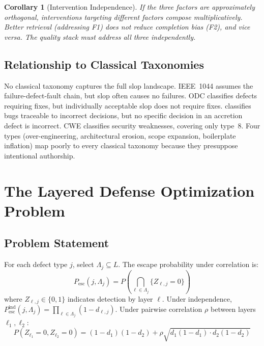 \documentclass[11pt, a4paper, copyright]{googledeepmind}
\newtheorem{corollary}{Corollary}[section]
\newcommand{\Pesc}{P_{\mathrm{esc}}}
\begin{document}
\begin{corollary}[Intervention Independence]
If the three factors are approximately orthogonal, interventions targeting different factors compose multiplicatively. Better retrieval (addressing F1) does not reduce completion bias (F2), and vice versa. The quality stack must address all three independently.
\end{corollary}

\subsection{Relationship to Classical Taxonomies}

No classical taxonomy captures the full slop landscape. IEEE~1044 \citep{ieee1044} assumes the failure-defect-fault chain, but slop often causes no failures. ODC \citep{chillarege1992} classifies defects requiring fixes, but individually acceptable slop does not require fixes. \citet{beizer1990} classifies bugs traceable to incorrect decisions, but no specific decision in an accretion defect is incorrect. CWE classifies security weaknesses, covering only type~8. Four types (over-engineering, architectural erosion, scope expansion, boilerplate inflation) map poorly to every classical taxonomy because they presuppose intentional authorship.


\section{The Layered Defense Optimization Problem}
\label{sec:optimization}

\subsection{Problem Statement}

For each defect type $j$, select $\Lambda_j \subseteq L$. The escape probability under correlation is:
\begin{equation}
\label{eq:pesc}
\Pesc(j, \Lambda_j) = P\!\left(\bigcap_{\ell \in \Lambda_j} \{Z_{\ell,j} = 0\}\right)
\end{equation}
where $Z_{\ell,j} \in \{0,1\}$ indicates detection by layer $\ell$. Under independence, $\Pesc^{\mathrm{ind}}(j, \Lambda_j) = \prod_{\ell \in \Lambda_j} (1 - d_{\ell,j})$. Under pairwise correlation $\rho$ between layers $\ell_1, \ell_2$:
\begin{equation}
P(Z_{\ell_1} = 0, Z_{\ell_2} = 0) = (1-d_1)(1-d_2) + \rho\sqrt{d_1(1-d_1) \cdot d_2(1-d_2)}
\end{equation}
\end{document}
